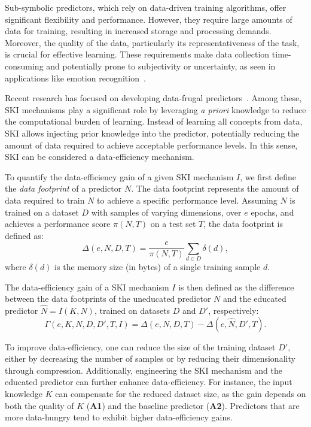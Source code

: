 %
Sub-symbolic predictors, which rely on data-driven training algorithms, offer significant flexibility and performance.
%
However, they require large amounts of data for training, resulting in increased storage and processing demands.
%
Moreover, the quality of the data, particularly its representativeness of the task, is crucial for effective learning.
%
These requirements make data collection time-consuming and potentially prone to subjectivity or uncertainty, as seen in applications like emotion recognition~\cite{CITATION}.

%
Recent research has focused on developing data-frugal predictors~\cite{CITATION}.
%
Among these, \gls{SKI} mechanisms play a significant role by leveraging \emph{a priori} knowledge to reduce the computational burden of learning.
%
Instead of learning all concepts from data, \gls{SKI} allows injecting prior knowledge into the predictor, potentially reducing the amount of data required to achieve acceptable performance levels.
%
In this sense, \gls{SKI} can be considered a \gls{data-efficiency} mechanism.

%
To quantify the \gls{data-efficiency} gain of a given \gls{SKI} mechanism \(I\), we first define the \emph{data footprint} of a predictor \(N\).
%
The data footprint represents the amount of data required to train \(N\) to achieve a specific performance level.
%
Assuming \(N\) is trained on a dataset \(D\) with samples of varying dimensions, over \(e\) epochs, and achieves a performance score \(\pi(N, T)\) on a test set \(T\), the data footprint is defined as:
%
\begin{equation}
    \label{eq:data-footprint}
    \Delta(e, N, D, T) = \frac{e}{\pi(N, T)} \sum_{d \in D} \delta(d),
\end{equation}
%
where \(\delta(d)\) is the memory size (in bytes) of a single training sample \(d\).

%
The \gls{data-efficiency} gain of a \gls{SKI} mechanism \(I\) is then defined as the difference between the data footprints of the uneducated predictor \(N\) and the educated predictor \(\hat{N} = I(K, N)\), trained on datasets \(D\) and \(D'\), respectively:
%
\begin{equation}
    \label{eq:data-efficiency-gain}
    \Gamma(e, K, N, D, D', T, I) = \Delta(e, N, D, T) - \Delta(e, \hat{N}, D', T).
\end{equation}

%
To improve \gls{data-efficiency}, one can reduce the size of the training dataset \(D'\), either by decreasing the number of samples or by reducing their dimensionality through compression.
%
Additionally, engineering the \gls{SKI} mechanism and the educated predictor can further enhance \gls{data-efficiency}.
%
For instance, the input knowledge \(K\) can compensate for the reduced dataset size, as the gain depends on both the quality of \(K\) (\textbf{A1}) and the baseline predictor (\textbf{A2}).
%
Predictors that are more data-hungry tend to exhibit higher \gls{data-efficiency} gains.


